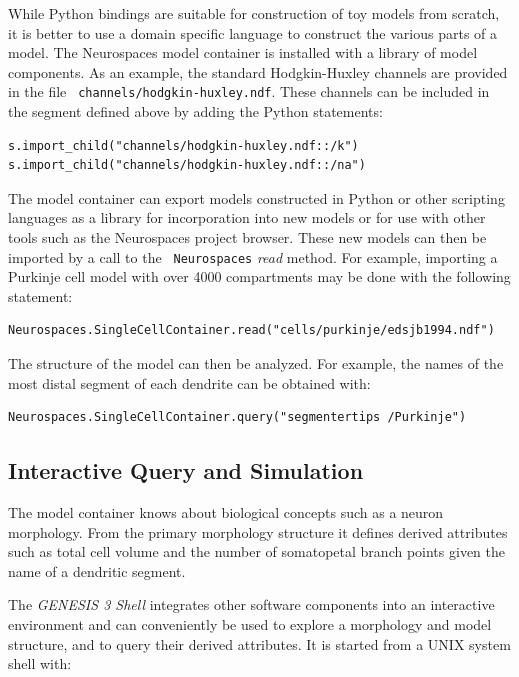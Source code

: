 \documentclass[12pt]{article}
\begin{document}
While Python bindings are suitable for construction of toy models from
scratch, it is better to use a domain specific language to construct
the various parts of a model. The Neurospaces model container is
installed with a library of model components.  As an example, the
standard Hodgkin-Huxley channels are provided in the file {\tt
  channels/hodgkin-huxley.ndf}.  These channels can be included in the
segment defined above by adding the Python statements:

{\footnotesize
  \resetlinenumber[23]
  \linenumbers
\begin{verbatim}
s.import_child("channels/hodgkin-huxley.ndf::/k")
s.import_child("channels/hodgkin-huxley.ndf::/na")
\end{verbatim}
}

The model container can export models constructed in Python or other
scripting languages as a library for incorporation into new models or
for use with other tools such as the Neurospaces project browser.
These new models can then be imported by a call to the {\tt
  Neurospaces} {\it read} method. For example, importing a Purkinje
cell model with over 4000 compartments may be done with the following
statement:

{\footnotesize
\begin{verbatim}
Neurospaces.SingleCellContainer.read("cells/purkinje/edsjb1994.ndf")
\end{verbatim}
}

The structure of the model can then be analyzed.  For example, the
names of the most distal segment of each dendrite can be obtained
with:

{\footnotesize
\begin{verbatim}
Neurospaces.SingleCellContainer.query("segmentertips /Purkinje")
\end{verbatim}
}


\subsection{Interactive Query and Simulation}

The model container knows about biological concepts such as a neuron
morphology.  From the primary morphology structure it defines derived
attributes such as total cell volume and the number of somatopetal
branch points given the name of a dendritic segment.

The {\it GENESIS 3 Shell} integrates other software components into an
interactive environment and can conveniently be used to explore a
morphology and model structure, and to query their derived attributes.
It is started from a UNIX system shell with:
\end{document}

